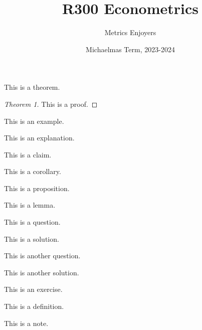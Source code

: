 \documentclass[DIV=14,titlepage=false]{scrreprt}
\title{%
R300 Econometrics}
\author{Metrics Enjoyers}
\date{Michaelmas Term, 2023-2024}
\begin{document}
\maketitle

\tableofcontents
\newpage






\newpage
\begin{theorem}
  This is a theorem.
  \end{theorem}
  \begin{proof}[Theorem 1]
  This is a proof.
  \end{proof}
  \begin{example}
  This is an example.
  \end{example}
  \begin{explanation}
  This is an explanation.
  \end{explanation}
  \begin{claim}
  This is a claim.
  \end{claim}
  \begin{corollary}
  This is a corollary.
  \end{corollary}
  \begin{prop}
  This is a proposition.
  \end{prop}
  \begin{lemma}
  This is a lemma.
  \end{lemma}
  \begin{question}
  This is a question.
  \end{question}
  \begin{solution}
  This is a solution.
  \end{solution}
   \begin{question}
  This is another question.
  \end{question}
  \begin{solution}
  This is another solution.
  \end{solution}
  \begin{exercise}
  This is an exercise.
  \end{exercise}
  \begin{definition}[Test]
  This is a definition.
  \end{definition}
  \begin{note}
  This is a note.
  \end{note}
\end{document}
